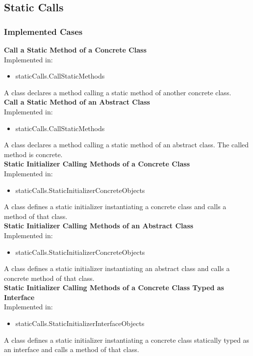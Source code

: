 \documentclass{article}
\begin{document}
\subsection{Static Calls}

\subsubsection{Implemented Cases}

\textbf{Call a Static Method of a Concrete Class}\\
Implemented in: 
\begin{itemize}
    \item staticCalls.CallStaticMethods
\end{itemize}
A class declares a method calling a static method of another concrete class.\\

\noindent
\textbf{Call a Static Method of an Abstract Class}\\
Implemented in: 
\begin{itemize}
    \item staticCalls.CallStaticMethods
\end{itemize}
A class declares a method calling a static method of an abstract class. The called method is concrete.\\

\noindent
\textbf{Static Initializer Calling Methods of a Concrete Class}\\
Implemented in: 
\begin{itemize}
    \item staticCalls.StaticInitializerConcreteObjects
\end{itemize}
A class defines a static initializer instantiating a concrete class and calls a method of that class.\\

\noindent
\textbf{Static Initializer Calling Methods of an Abstract Class}\\
Implemented in: 
\begin{itemize}
    \item staticCalls.StaticInitializerConcreteObjects
\end{itemize}
A class defines a static initializer instantiating an abstract class and calls a concrete method of that class.\\

\noindent
\textbf{Static Initializer Calling Methods of a Concrete Class Typed as Interface}\\
Implemented in: 
\begin{itemize}
    \item staticCalls.StaticInitializerInterfaceObjects
\end{itemize}
A class defines a static initializer instantiating a concrete class statically typed as an interface and calls a method of that class.\\
\end{document}
